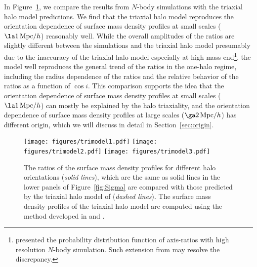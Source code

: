 \documentclass[a4paper,fleqn,usenatbib]{mnras}
\newcommand{\Mpc}{\mathrm{Mpc}}
\begin{document}
In Figure~\ref{fig:trimodel}, we compare the results from $N$-body
simulations with the triaxial halo model predictions. We find that the
triaxial halo model reproduces the orientation dependence of surface
mass density profiles at small scales ($\la 1\,\Mpc/h$) reasonably well.
While the overall amplitudes of the ratios are slightly
different between the simulations and the triaxial
halo model presumably due to the inaccuracy of the triaxial halo model
especially at high mass end\footnote{\citet{Bonamigo2015} presented
the probability distribution function of axis-ratios with high resolution
$N$-body simulation. Such extension from \citet{Jing2002}
may resolve the discrepancy.},
the model well reproduces the general
trend of the ratios in the one-halo regime, including the radius
dependence of the ratios and the relative behavior of the ratios as a
function of $\cos i$. This comparison supports the idea that the
orientation dependence of surface mass density profiles at small
scales ($\la 1\,\Mpc/h$) can mostly be explained by the halo
triaxiality, and the orientation dependence of surface mass density
profiles at large scales ($\ga 2\,\Mpc/h$) has different origin,
which we will discuss in detail in Section~\ref{sec:origin}.

\begin{figure}
\texttt{[image: figures/trimodel1.pdf]}
\texttt{[image: figures/trimodel2.pdf]}
\texttt{[image: figures/trimodel3.pdf]}
\caption{The ratios of the surface mass density profiles for different halo
  orientations ({\it solid lines}),
  which are the same as solid lines in
  the lower panels of Figure~\ref{fig:Sigma}
  are compared with those predicted
  by the triaxial halo model of \citet{Jing2002} ({\it dashed lines}).
  The surface mass density profiles of the triaxial halo model are
  computed using the method developed in \citet{Oguri2003} and
  \citet{Oguri2009}.}
\label{fig:trimodel}
\end{figure}
\end{document}

